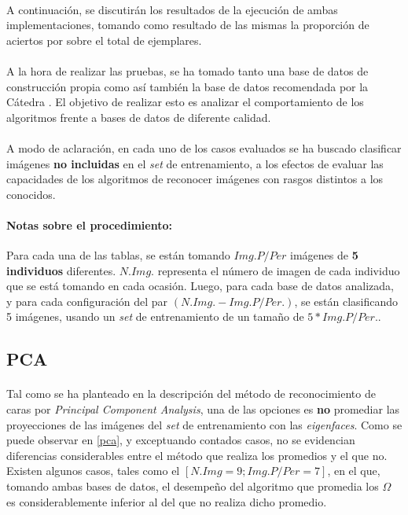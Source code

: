 \documentclass[12pt, twocolumn]{article}
\begin{document}
	\paragraph{} A continuación, se discutirán los resultados de la ejecución de ambas implementaciones, tomando como resultado de las mismas la proporción de aciertos por sobre el total de ejemplares. 
	
	\paragraph{} A la hora de realizar las pruebas, se ha tomado tanto una base de datos de construcción propia como así también la base de datos recomendada por la Cátedra \cite{dbf}. El objetivo de realizar esto es analizar el comportamiento de los algoritmos frente a bases de datos de diferente calidad. 
	
	\paragraph{} A modo de aclaración, en cada uno de los casos evaluados se ha buscado clasificar imágenes \textbf{no incluidas} en el \textit{set} de entrenamiento, a los efectos de evaluar las capacidades de los algoritmos de reconocer imágenes con rasgos distintos a los conocidos.
	
	\paragraph{Notas sobre el procedimiento:} Para cada una de las tablas, se están tomando $Img. P/Per$ imágenes de \textbf{5 individuos} diferentes. $N.Img.$ representa el número de imagen de cada individuo que se está tomando en cada ocasión. Luego, para cada base de datos analizada, y para cada configuración del par $(N. Img. - Img. P/Per.)$, se están clasificando 5 imágenes, usando un \textit{set} de entrenamiento de un tamaño de $5*Img. P/Per.$.
	
	
	\subsection{PCA}
	
	\paragraph{} Tal como se ha planteado en la descripción del método de reconocimiento de caras por \textit{Principal Component Analysis}, una de las opciones es \textbf{no} promediar las proyecciones de las imágenes del \textit{set} de entrenamiento con las \textit{eigenfaces}. Como se puede observar en \ref{pca}, y exceptuando contados casos, no se evidencian diferencias considerables entre el método que realiza los promedios y el que no. Existen algunos casos, tales como el $[N. Img = 9; Img. P/Per = 7]$, en el que, tomando ambas bases de datos, el desempeño del algoritmo que promedia los $\Omega$ es considerablemente inferior al del que no realiza dicho promedio. 
	
\end{document}
